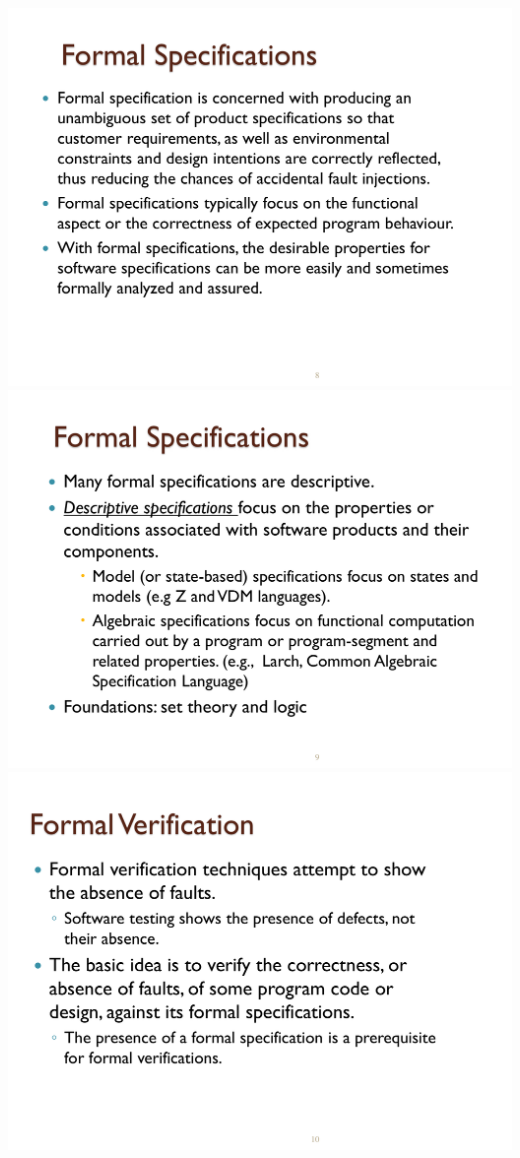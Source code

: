 \documentclass[a4paper]{article}
\begin{document}
\begin{multicols}{3}
        \includegraphics[width=\linewidth]{440.pdf}\\
        \includegraphics[width=\linewidth]{441.pdf}\\
        \includegraphics[width=\linewidth]{442.pdf}\\

\end{multicols}
\end{document}

